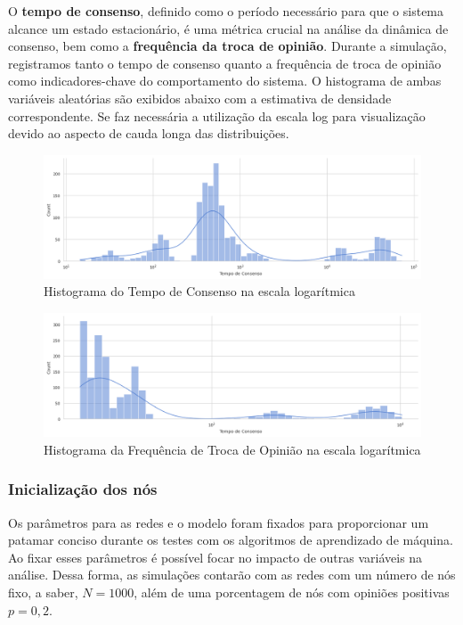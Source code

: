 O \textbf{tempo de consenso}, definido como o período necessário para
que o sistema alcance um estado estacionário, é uma métrica crucial na
análise da dinâmica de consenso, bem como a \textbf{frequência da troca
de opinião}. Durante a simulação, registramos tanto o tempo de consenso
quanto a frequência de troca de opinião como indicadores-chave do
comportamento do sistema. O histograma de ambas variáveis aleatórias são
exibidos abaixo com a estimativa de densidade correspondente. Se faz
necessária a utilização da escala log para visualização devido ao
aspecto de cauda longa das distribuições.

\begin{figure}
\centering
\includegraphics[width=6.25in,height=\textheight]{consensus_hist.png}
\caption{Histograma do Tempo de Consenso na escala logarítmica}
\end{figure}

\begin{figure}
\centering
\includegraphics[width=6.25in,height=\textheight]{frequency_hist.png}
\caption{Histograma da Frequência de Troca de Opinião na escala
logarítmica}
\end{figure}

\subsubsection{Inicialização dos
nós}\label{inicializauxe7uxe3o-dos-nuxf3s}

Os parâmetros para as redes e o modelo foram fixados para proporcionar
um patamar conciso durante os testes com os algoritmos de aprendizado de
máquina. Ao fixar esses parâmetros é possível focar no impacto de outras
variáveis na análise. Dessa forma, as simulações contarão com as redes
com um número de nós fixo, a saber, \(N=1000\), além de uma porcentagem
de nós com opiniões positivas \(p = 0,2\).

